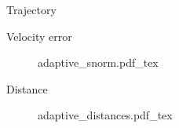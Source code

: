 \begin{frame}{Trajectory}
    \begin{figure}[ht!]
        \centering
        \quad
    \end{figure}
\end{frame}


\begin{frame}{Velocity error}
    \begin{figure}[ht!]
        \centering
        \def\svgwidth{.9\linewidth}
        {\scriptsize{adaptive_snorm.pdf_tex}}
    \end{figure}
\end{frame}

\begin{frame}{Distance}
    \begin{figure}[ht!]
        \centering
        \def\svgwidth{.9\linewidth}
        {\scriptsize{adaptive_distances.pdf_tex}}
    \end{figure}
\end{frame}